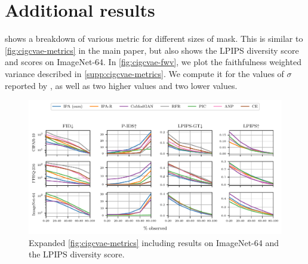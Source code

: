 
\section{Additional results} \label{supp:cigcvae-additional-results}

 shows a breakdown of various metric for different sizes
of mask. This is similar to \cref{fig:cigcvae-metrics} in the main paper, but also shows
the LPIPS diversity score and scores on ImageNet-64. In \cref{fig:cigcvae-fwv}, we plot
the faithfulness weighted variance described in \cref{supp:cigcvae-metrics}. We compute
it for the values of $\sigma$ reported by \citet{li2020multimodal}, as well as
two higher values and two lower values.
\begin{figure}
  \includegraphics[width=\textwidth]{figs/cigcvae/extra-metrics}
  \caption{Expanded \cref{fig:cigcvae-metrics} including results on ImageNet-64 and the
    LPIPS diversity score.}
  \label{fig:cigcvae-extra-metrics}
\end{figure}


